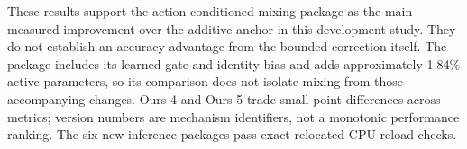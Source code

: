 These results support the action-conditioned mixing package as the main
measured improvement over the additive anchor in this development study.
They do not establish an accuracy advantage from the bounded correction
itself. The package includes its learned gate and identity bias and adds
approximately 1.84\% active parameters, so its comparison does not isolate
mixing from those accompanying changes. Ours-4 and Ours-5 trade small point
differences across metrics; version numbers are mechanism identifiers, not a
monotonic performance ranking. The six new inference packages pass exact
relocated CPU reload checks.

